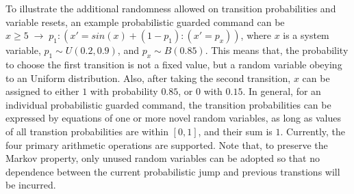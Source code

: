 To illustrate the additional randomness allowed on transition probabilities and variable resets, an example probabilistic guarded command can be $x \geq 5 \; \rightarrow \; p_1:(x' = sin(x) + (1-p_1):(x' = p_x))$, where $x$ is a system variable, $p_1 \sim  U(0.2, 0.9)$, and $p_x  \sim  B(0.85)$. This means that, the probability to choose the first transition is not a fixed value, but a random variable obeying to an Uniform distribution. Also, after taking the second transition, $x$ can be assigned to either $1$ with probability $0.85$, or $0$ with $0.15$. In general, for an individual probabilistic guarded command, the transition probabilities can be expressed by equations of one or more novel random variables, as long as values of all transtion probabilities are within $[0, 1]$, and their sum is $1$. Currently, the four primary arithmetic operations are supported. Note that, to preserve the Markov property, only unused random variables can be adopted so that no dependence between the current probabilistic jump and previous transtions will be incurred. 





